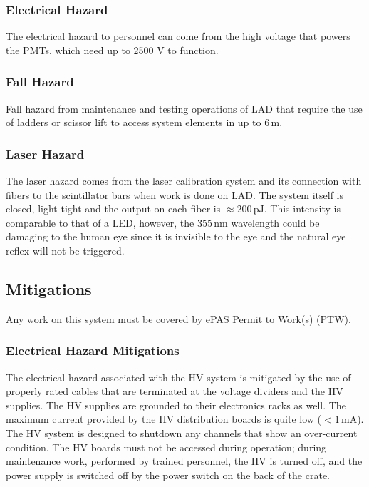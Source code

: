 \indent
\subsubsection{Electrical Hazard}

The electrical hazard to personnel can come from the high voltage that powers the PMTs,  which need
up to 2500 V to function. 

\subsubsection{Fall Hazard}

Fall hazard from maintenance and testing operations of LAD that require the use of ladders or scissor lift to access
system elements in up to 6\,m. 

\subsubsection{Laser Hazard}

The laser hazard comes from the laser calibration system and its connection with fibers to the scintillator
bars when work is done on LAD.  The system itself is closed,  light-tight and the output on each fiber is
$\approx 200\,\mathrm{pJ}$.  This intensity is comparable to that of a LED,  however,  the $355\,\mathrm{nm}$
wavelength could be damaging to the human eye since it is invisible to the eye and the natural eye reflex
will not be triggered. 

\subsection{Mitigations}

Any work on this system must be covered by ePAS Permit to Work(s) (PTW).

\indent
\subsubsection{Electrical Hazard Mitigations} 

The electrical hazard associated with the HV system is mitigated by the use of properly rated cables
that are terminated at the voltage dividers and the HV supplies.
The HV supplies are grounded to their electronics racks as well. 
The maximum current provided by the HV distribution boards is quite low ($<1\,\mathrm{mA}$).  The HV system
is designed to shutdown any channels that show an over-current condition. The HV boards must not be accessed
during operation; during maintenance work,  performed by trained personnel,  the HV is turned off,  and the
power supply is switched off by the power switch on the back of the crate.

